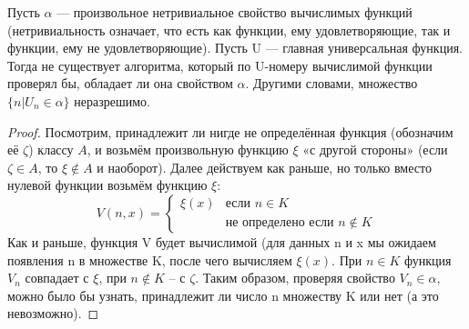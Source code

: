 \begin{theorem}
Пусть $\alpha $ — произвольное нетривиальное свойство вычислимых функций (нетривиальность означает, что есть как функции, ему удовлетворяющие, так и функции, ему не удовлетворяющие). Пусть U — главная универсальная функция. Тогда не существует алгоритма, который по U-номеру вычислимой функции проверял бы, обладает ли она свойством $\alpha$. Другими словами, множество $\{n | U_n \in \alpha \}$ неразрешимо.
\end{theorem}
\begin{proof}
Посмотрим, принадлежит ли нигде не определённая функция (обозначим её $\zeta$) классу $A$, и возьмём произвольную функцию $\xi$ «с другой стороны» (если $\zeta \in A$, то $\xi \notin A$ и наоборот). Далее действуем как раньше, но только вместо нулевой функции возьмём функцию $\xi$: 
\begin{equation*}
V(n,x) = 
 \begin{cases}
   \xi (x) &\text{если $n \in K$}\\
   &\text{не определено если $n \notin K$}
 \end{cases}
\end{equation*} 
Как и раньше, функция V будет вычислимой (для данных n и x мы ожидаем появления n в множестве K, после чего вычисляем $\xi (x)$. При $n \in K$ функция $V_n$ совпадает с $\xi$, при $n \notin K$ -- с $\zeta$. Таким образом, проверяя свойство $V_n \in \alpha$, можно было бы узнать, принадлежит ли число n множеству K или нет (а это невозможно).
\end{proof}